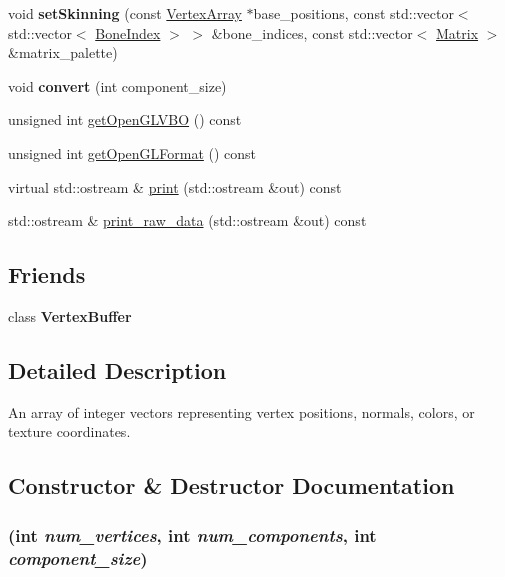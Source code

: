 \begin{CompactItemize}
\item 
\hypertarget{classm3g_1_1VertexArray_fcfcc1258ce0be7d0322d2e00809e1ea}{
void \textbf{setSkinning} (const \hyperlink{classm3g_1_1VertexArray}{VertexArray} $\ast$base\_\-positions, const std::vector$<$ std::vector$<$ \hyperlink{structm3g_1_1BoneIndex}{BoneIndex} $>$ $>$ \&bone\_\-indices, const std::vector$<$ \hyperlink{classm3g_1_1Matrix}{Matrix} $>$ \&matrix\_\-palette)}
\label{classm3g_1_1VertexArray_fcfcc1258ce0be7d0322d2e00809e1ea}

\item 
\hypertarget{classm3g_1_1VertexArray_5c2359d08265a9f8605316789c40ece4}{
void \textbf{convert} (int component\_\-size)}
\label{classm3g_1_1VertexArray_5c2359d08265a9f8605316789c40ece4}

\item 
unsigned int \hyperlink{classm3g_1_1VertexArray_720ecee697dbf11d5f90dc998817b39d}{getOpenGLVBO} () const 
\item 
unsigned int \hyperlink{classm3g_1_1VertexArray_3e28ae5596cde78a980de02005a136f2}{getOpenGLFormat} () const 
\item 
virtual std::ostream \& \hyperlink{classm3g_1_1VertexArray_6fea17fa1532df3794f8cb39cb4f911f}{print} (std::ostream \&out) const 
\item 
std::ostream \& \hyperlink{classm3g_1_1VertexArray_85d61f1cdd10b3b5126cdb20291ae276}{print\_\-raw\_\-data} (std::ostream \&out) const 
\end{CompactItemize}
\subsection*{Friends}
\begin{CompactItemize}
\item 
\hypertarget{classm3g_1_1VertexArray_9ef9a3db41cb54690169922706e1d3c5}{
class \textbf{VertexBuffer}}
\label{classm3g_1_1VertexArray_9ef9a3db41cb54690169922706e1d3c5}

\end{CompactItemize}


\subsection{Detailed Description}
An array of integer vectors representing vertex positions, normals, colors, or texture coordinates. 

\subsection{Constructor \& Destructor Documentation}
\hypertarget{classm3g_1_1VertexArray_5f38e30d23b5dc34b223e749e8afd0d0}{
\subsubsection[{VertexArray}]{ (int {\em num\_\-vertices}, \/  int {\em num\_\-components}, \/  int {\em component\_\-size})}}
\label{classm3g_1_1VertexArray_5f38e30d23b5dc34b223e749e8afd0d0}


